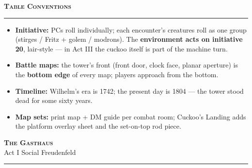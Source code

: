 \documentclass[10pt,letterpaper]{article}
\newcommand{\sceneheader}[4]{%
  \fancyhead[L]{\small\textcolor{accent}{\scshape #1}}%
  \fancyhead[R]{\small\textcolor{accent}{#2 \quad \textbullet \quad #3}}%
  \begin{center}
  {\LARGE\bfseries\scshape\textcolor{accent}{#1}}\\[2pt]
  {\small #2 \quad \textbullet \quad #3 \quad \textbullet \quad #4}\\[2pt]
  \textcolor{rulecol}{\rule{0.5\textwidth}{0.8pt}}
  \end{center}
  \vspace{-4pt}
}
\begin{document}
\vspace{10pt}
{\large\bfseries\scshape Table Conventions}\\[-2pt]
\textcolor{rulecol}{\rule{\textwidth}{0.6pt}}
\begin{itemize}
\item \textbf{Initiative:} PCs roll individually; each encounter's creatures roll as one group (stirges / Fritz + golem / modrons). The \textbf{environment acts on initiative 20}, lair-style --- in Act III the cuckoo itself is part of the machine turn.
\item \textbf{Battle maps:} the tower's front (front door, clock face, planar aperture) is the \textbf{bottom edge} of every map; players approach from the bottom.
\item \textbf{Timeline:} Wilhelm's era is 1742; the present day is 1804 --- the tower stood dead for some sixty years.
\item \textbf{Map sets:} print map + DM guide per combat room; Cuckoo's Landing adds the platform overlay sheet and the set-on-top rod piece.
\end{itemize}

\newpage


\label{sec:gasthaus}\sceneheader{The Gasthaus}{Act I}{Social}{Freudenfeld}
\end{document}
